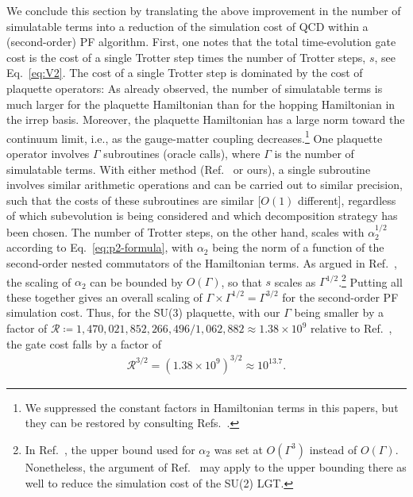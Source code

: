 \documentclass[aps,prd,twocolumn,showpacs,groupedaddress,superscriptaddress,nofootinbib,floatfix,preprintnumbers,longbibliography]{revtex4-1}
\begin{document}
We conclude this section by translating the above improvement in the number of simulatable terms into a reduction of the simulation cost of QCD within a (second-order) PF algorithm. First, one notes that the total time-evolution gate cost is the cost of a single Trotter step times the number of Trotter steps, $s$, see Eq.~\eqref{eq:V2}. The cost of a single Trotter step is dominated by the cost of plaquette operators: As already observed, the number of simulatable terms is much larger for the plaquette Hamiltonian than for the hopping Hamiltonian in the irrep basis. Moreover, the plaquette Hamiltonian has a large norm toward the continuum limit, i.e., as the gauge-matter coupling decreases.\footnote{We suppressed the constant factors in Hamiltonian terms in this papers, but they can be restored by consulting Refs.~\cite{Byrnes:2005qx,Kan:2021xfc}.} One plaquette operator involves $\Gamma$ subroutines (oracle calls), where $\Gamma$ is the number of simulatable terms. With either method (Ref.~\cite{Kan:2021xfc} or ours), a single subroutine involves similar arithmetic operations and can be carried out to similar precision, such that the costs of these subroutines are similar [$O(1)$ different], regardless of which subevolution is being considered and which decomposition strategy has been chosen. The number of Trotter steps, on the other hand, scales with $\alpha_2^{1/2}$ according to Eq.~\eqref{eq:p2-formula}, with $\alpha_2$ being the norm of a function of the second-order nested commutators of the Hamiltonian terms. As argued in Ref.~\cite{Kan:2021xfc}, the scaling of $\alpha_2$ can be bounded by $O(\Gamma)$, so that $s$ scales as $\Gamma^{1/2}$.\footnote{In Ref.~\cite{Davoudi:2022xmb}, the upper bound used for $\alpha_2$ was set at $O(\Gamma^3)$ instead of $O(\Gamma)$. Nonetheless, the argument of Ref.~\cite{Kan:2021xfc} may apply to the upper bounding there as well to reduce the simulation cost of the SU(2) LGT.} Putting all these together gives an overall scaling of $\Gamma \times \Gamma^{1/2} = \Gamma^{3/2}$ for the second-order PF simulation cost. Thus, for the SU(3) plaquette, with our $\Gamma$ being smaller by a factor of $\mathcal{R} \coloneq 1,470,021,852,266,496/1,062,882 \approx 1.38 \times 10^9$ relative to Ref.~\cite{Kan:2021xfc}, the gate cost falls by a factor of
%
\begin{align}
\mathcal{R}^{3/2}=(1.38 \times 10^9)^{3/2} \approx 10^{13.7}.
\end{align}
%

\end{document}
